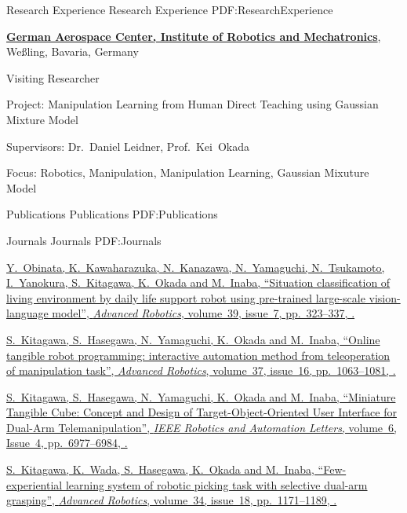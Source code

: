 \documentclass[letterpaper,MMMyyyy,nonstopmode]{simpleresumecv}
\begin{document}
\begin{Body}

\Section
{Research Experience}
{Research Experience}
{PDF:ResearchExperience}

\Gap
\Entry
\href{https://www.dlr.de/EN/Home/home_node.html}
{\textbf{German Aerospace Center, Institute of Robotics and Mechatronics}},
Weßling, Bavaria, Germany 
\Gap

\Gap
Visiting Researcher
\hfill
{}
\begin{Detail}
\par
Project:
Manipulation Learning from Human Direct Teaching using Gaussian Mixture Model
\par
Supervisors:
Dr.~Daniel Leidner,
Prof.~Kei~Okada
\par
Focus:
Robotics, Manipulation, Manipulation Learning, Gaussian Mixuture Model
\end{Detail}
\Gap


\Section
{Publications}
{Publications}
{PDF:Publications}

\SubSection
{Journals}
{Journals}
{PDF:Journals}

\begingroup

\BulletItem
\href{https://doi.org/10.1080/01691864.2025.2487608}
{Y.~Obinata, K.~Kawaharazuka, N.~Kanazawa, N.~Yamaguchi, N.~Tsukamoto, I.~Yanokura, \underline{S.~Kitagawa}, K.~Okada and M.~Inaba,
``Situation classification of living environment by daily life support robot using pre-trained large-scale vision-language model'',
\textit{Advanced Robotics},
volume~39,
issue~7,
pp.~323--337,
.}

\Gap
\BulletItem
\href{https://doi.org/10.1080/01691864.2023.2239316}
{\underline{S.~Kitagawa}, S.~Hasegawa, N.~Yamaguchi, K.~Okada and M.~Inaba,
``Online tangible robot programming: interactive automation method from teleoperation of manipulation task'',
\textit{Advanced Robotics},
volume~37,
issue~16,
pp.~1063--1081,
.}

\Gap
\BulletItem
\href{https://doi.org/10.1109/LRA.2021.3096475}
{\underline{S.~Kitagawa}, S.~Hasegawa, N.~Yamaguchi, K.~Okada and M.~Inaba,
``Miniature Tangible Cube: Concept and Design of Target-Object-Oriented User Interface for Dual-Arm Telemanipulation'',
\textit{IEEE Robotics and Automation Letters},
volume~6,
Issue~4,
pp.~6977--6984,
.}

\Gap
\BulletItem
\href{https://doi.org/10.1080/01691864.2020.1783352}
{\underline{S.~Kitagawa}, K.~Wada, S.~Hasegawa, K.~Okada and M.~Inaba,
``Few-experiential learning system of robotic picking task with selective dual-arm grasping'',
\textit{Advanced Robotics},
volume~34,
issue~18,
pp.~1171--1189,
.}


\end{Body}
\end{document}
